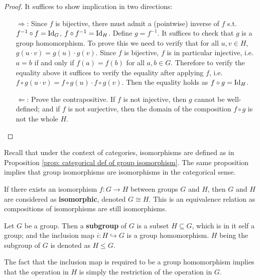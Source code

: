 \begin{proof}
    It suffices to show implication in two directions:
    \begin{enumerate}
        \item[$\Rightarrow$:] Since $f$ is bijective, there must admit a (pointwise) inverse of $f$ s.t. $f^{-1} \circ f = \mathrm{Id}_{G}$, $f \circ f^{-1} = \mathrm{Id}_H$. Define $g = f^{-1}$. It suffices to check that $g$ is a group homomorphism. To prove this we need to verify that for all $u, v \in H$, $g(u \cdot v) = g(u) \cdot g(v)$. Since $f$ is bijective, $f$ is in particular injective, i.e. $a = b$ if and only if $f(a) = f(b)$ for all $a, b \in G$. Therefore to verify the equality above it suffices to verify the equality after applying $f$, i.e. $f \circ g(u \cdot v) = f \circ g(u) \cdot f \circ g(v)$. Then the equality holds as $f \circ g = \mathrm{Id}_H$. 
        \item[$\Leftarrow$:] Prove the contrapositive. If $f$ is not injective, then $g$ cannot be well-defined; and if $f$ is not surjective, then the domain of the composition $f \circ g$ is not the whole $H$.
    \end{enumerate}
\end{proof}

\begin{remark}
    Recall that under the context of categories, isomorphisms are defined as in Proposition \ref{prop: categorical def of group isomorphism}. The same proposition implies that group isomorphisms are isomorphisms in the categorical sense. 
\end{remark}

\begin{remark}
    If there exists an isomorphism $f: G \to H$ between groups $G$ and $H$, then $G$ and $H$ are considered as \textbf{isomorphic}, denoted $G \cong H$. This is an equivalence relation as compositions of isomorphisms are still isomorphisms.
\end{remark}

\begin{definition}
    Let $G$ be a group. Then a \textbf{subgroup} of $G$ is a subset $H \subseteq G$, which is in it self a group; and the inclusion map $i: H \hookrightarrow G$ is a group homomorphism. $H$ being the subgroup of $G$ is denoted as $H \leq G$.
\end{definition}

\begin{remark}
    The fact that the inclusion map is required to be a group homomorphism implies that the operation in $H$ is simply the restriction of the operation in $G$.
\end{remark}

